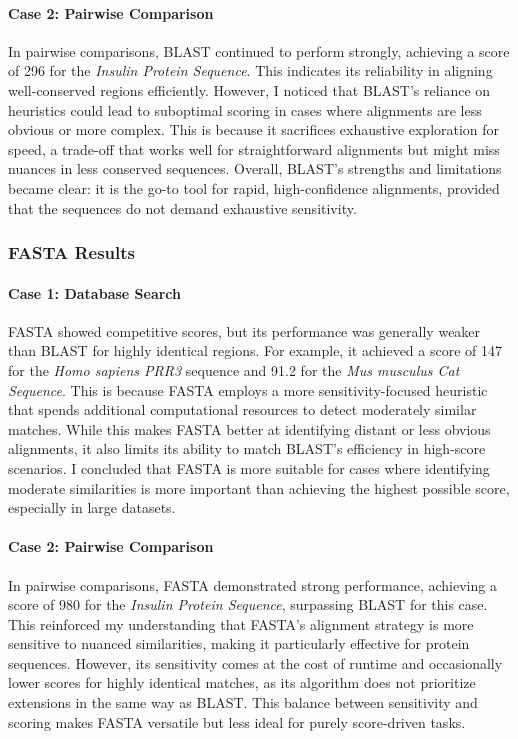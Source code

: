 \documentclass{article}
\begin{document}
\paragraph{Case 2: Pairwise Comparison}
In pairwise comparisons, BLAST continued to perform strongly, achieving a score of 296 for the \textit{Insulin Protein Sequence}. This indicates its reliability in aligning well-conserved regions efficiently. However, I noticed that BLAST’s reliance on heuristics could lead to suboptimal scoring in cases where alignments are less obvious or more complex. This is because it sacrifices exhaustive exploration for speed, a trade-off that works well for straightforward alignments but might miss nuances in less conserved sequences. Overall, BLAST’s strengths and limitations became clear: it is the go-to tool for rapid, high-confidence alignments, provided that the sequences do not demand exhaustive sensitivity.

\subsubsection{ FASTA Results}

\paragraph{Case 1: Database Search}
FASTA showed competitive scores, but its performance was generally weaker than BLAST for highly identical regions. For example, it achieved a score of 147 for the \textit{Homo sapiens PRR3} sequence and 91.2 for the \textit{Mus musculus Cat Sequence}. This is because FASTA employs a more sensitivity-focused heuristic that spends additional computational resources to detect moderately similar matches. While this makes FASTA better at identifying distant or less obvious alignments, it also limits its ability to match BLAST’s efficiency in high-score scenarios. I concluded that FASTA is more suitable for cases where identifying moderate similarities is more important than achieving the highest possible score, especially in large datasets.

\paragraph{Case 2: Pairwise Comparison}
In pairwise comparisons, FASTA demonstrated strong performance, achieving a score of 980 for the \textit{Insulin Protein Sequence}, surpassing BLAST for this case. This reinforced my understanding that FASTA’s alignment strategy is more sensitive to nuanced similarities, making it particularly effective for protein sequences. However, its sensitivity comes at the cost of runtime and occasionally lower scores for highly identical matches, as its algorithm does not prioritize extensions in the same way as BLAST. This balance between sensitivity and scoring makes FASTA versatile but less ideal for purely score-driven tasks.
\end{document}
